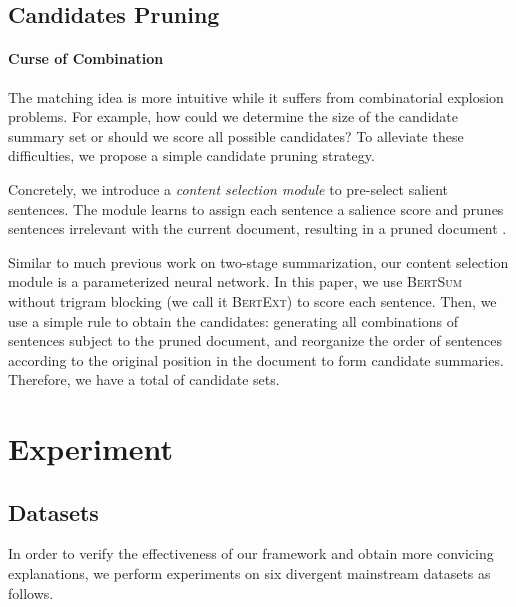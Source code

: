 \documentclass[11pt,a4paper]{article}
\begin{document}
\subsection{Candidates Pruning}

\paragraph{Curse of Combination}
The matching idea is more intuitive while it suffers from combinatorial explosion problems. For example, how could we determine the size of the candidate summary set or should we score all possible candidates?
To alleviate these difficulties, we propose a simple candidate pruning strategy.


Concretely, we introduce a \textit{content selection module} to pre-select salient sentences.
The module learns to assign each sentence a salience score and prunes sentences irrelevant with the current document, resulting in a pruned document  .

Similar to much previous work on two-stage summarization, our content selection module is a parameterized neural network. In this paper, we use \textsc{BertSum} \cite{liu2019text} without trigram blocking (we call it \textsc{BertExt}) to score each sentence. Then,  we use a simple rule to obtain the candidates: generating all combinations of  sentences subject to the pruned document, and reorganize the order of sentences according to the original position in the document to form candidate summaries. Therefore, we have a total of  candidate sets.

























\section{Experiment}

\subsection{Datasets}
In order to verify the effectiveness of our framework and obtain more convicing explanations, we perform experiments on six divergent mainstream datasets as follows.
\end{document}
